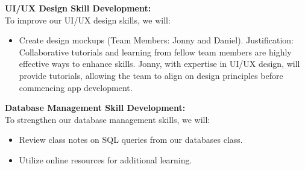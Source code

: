 \documentclass[12pt]{article}
\begin{document}
\begin{enumerate}
\textbf{UI/UX Design Skill Development:}\\
To improve our UI/UX design skills, we will:
\begin{itemize}
    \item Create design mockups (Team Members: Jonny and Daniel). Justification: Collaborative tutorials and learning from fellow team members are highly effective ways to enhance skills. Jonny, with expertise in UI/UX design, will provide tutorials, allowing the team to align on design principles before commencing app development.
\end{itemize}

\textbf{Database Management Skill Development:}\\
To strengthen our database management skills, we will:
\begin{itemize}
    \item Review class notes on SQL queries from our databases class.
    \item Utilize online resources for additional learning.
\end{itemize}

\end{enumerate}
\end{document}
